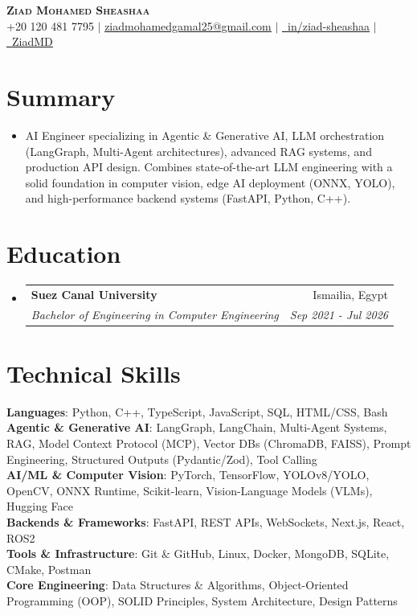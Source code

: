 \documentclass[letterpaper,11pt]{article}
\makeatletter
\newcommand{\resumeItem}[1]{
  \item\small{
    {#1 \vspace{-2.5pt}}
  }
}
\newcommand{\resumeSubheading}[4]{
  \vspace{-3pt}\item
    \begin{tabular*}{0.97\textwidth}[t]{l@{\extracolsep{\fill}}r}
      \textbf{#1} & #2 \\
      \textit{\small#3} & \textit{\small #4} \\
    \end{tabular*}\vspace{-7pt}
}
\newcommand{\resumeSubHeadingListStart}{\begin{itemize}[leftmargin=0.15in, label={}]}
\newcommand{\resumeSubHeadingListEnd}{\end{itemize}}
\makeatother
\begin{document}
\begin{center}
    \textbf{\Huge \scshape Ziad Mohamed Sheashaa} \\ \vspace{2pt}
    \small +20 120 481 7795 $|$ 
    \href{mailto:ziadmohamedgamal25@gmail.com}{\underline{ziadmohamedgamal25@gmail.com}} $|$
    \href{https://www.linkedin.com/in/ziad-sheashaa/}{\underline{\faLinkedin\ in/ziad-sheashaa}} $|$
    \href{https://github.com/ZiadMD}{\underline{\faGithub\ ZiadMD}}
\end{center}

\section{Summary}
    \resumeSubHeadingListStart
      \resumeItem{AI Engineer specializing in Agentic \& Generative AI, LLM orchestration (LangGraph, Multi-Agent architectures), advanced RAG systems, and production API design. Combines state-of-the-art LLM engineering with a solid foundation in computer vision, edge AI deployment (ONNX, YOLO), and high-performance backend systems (FastAPI, Python, C++).}
    \resumeSubHeadingListEnd

\section{Education}
  \resumeSubHeadingListStart
    \resumeSubheading
      {Suez Canal University}{Ismailia, Egypt}
      {Bachelor of Engineering in Computer Engineering}{Sep 2021 - Jul 2026}
  \resumeSubHeadingListEnd

\section{Technical Skills}
 \begin{itemize}[leftmargin=0.15in, label={}]
    \small{\item{
     \textbf{Languages}{: Python, C++, TypeScript, JavaScript, SQL, HTML/CSS, Bash} \\
     \textbf{Agentic \& Generative AI}{: LangGraph, LangChain, Multi-Agent Systems, RAG, Model Context Protocol (MCP), Vector DBs (ChromaDB, FAISS), Prompt Engineering, Structured Outputs (Pydantic/Zod), Tool Calling} \\
     \textbf{AI/ML \& Computer Vision}{: PyTorch, TensorFlow, YOLOv8/YOLO, OpenCV, ONNX Runtime, Scikit-learn, Vision-Language Models (VLMs), Hugging Face} \\
     \textbf{Backends \& Frameworks}{: FastAPI, REST APIs, WebSockets, Next.js, React, ROS2} \\
     \textbf{Tools \& Infrastructure}{: Git \& GitHub, Linux, Docker, MongoDB, SQLite, CMake, Postman} \\
     \textbf{Core Engineering}{: Data Structures \& Algorithms, Object-Oriented Programming (OOP), SOLID Principles, System Architecture, Design Patterns}
    }}
 \end{itemize}
\end{document}
